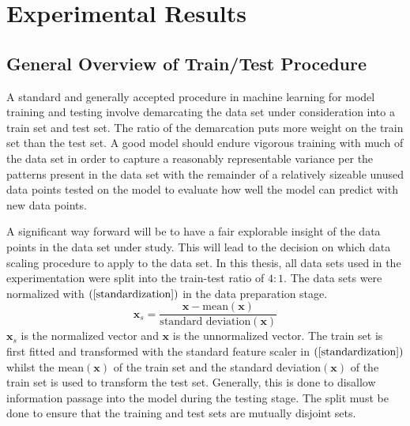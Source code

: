 
\chapter{Experimental Results}

\section{General Overview of Train/Test Procedure }
A standard and generally accepted procedure in machine learning for model training and testing involve demarcating the data set under consideration into a train set and test set. The ratio of the demarcation puts more weight on the train set than the test set. A good model should endure vigorous training with much of the data set in order to capture a reasonably representable variance per the patterns present in the data set with the remainder of a relatively sizeable unused data points tested on the model to evaluate how well the model can predict with new data points.

A significant way forward will be to have a fair explorable insight of the data points in the data set under study. This will lead to the decision on which data scaling procedure to apply to the data set.
In this thesis, all data sets used in the experimentation were split into the train-test ratio of $4:1$. The data sets were normalized  with  $\left( \ref{standardization}\right)$ in the data preparation stage.
\begin{equation}\label{standardization}
	\mathbf{x}_{s}=\frac{\mathbf{x}-\text{mean}(\mathbf{x})}{\text{standard deviation}(\mathbf{x})}
\end{equation} 
$\mathbf{x}_{s}$\hspace{2pt} is the normalized vector and \hspace{2pt}$\mathbf{x}$\hspace{2pt} is the unnormalized vector.
The train set is first fitted and transformed with the standard feature scaler in  $\left( \ref{standardization} \right) $  whilst the mean$\left(\mathbf{x} \right)$ \hspace{2pt}of the train set  and the standard deviation$\left(\mathbf{x}\right)$  of the train set is used to transform the test set. Generally, this is done to disallow information passage into the model during the testing stage.
The split must be done to ensure that the training and test sets are mutually disjoint sets.


